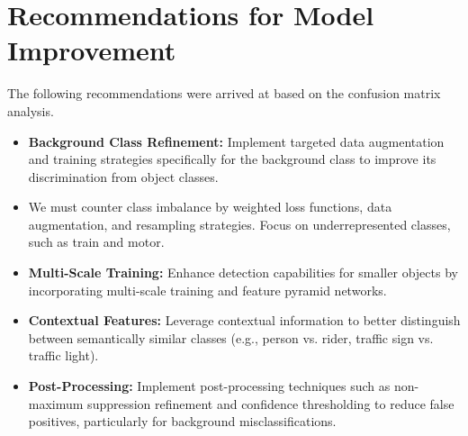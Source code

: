 \documentclass[12pt,a4paper]{report}
\theoremstyle{definition}
\theoremstyle{remark}
\begin{document}
\section*{Recommendations for Model Improvement}

The following recommendations were arrived at based on the confusion matrix analysis.

\begin{itemize}
	\item \textbf{Background Class Refinement:} Implement targeted data augmentation and training strategies specifically for the background class to improve its discrimination from object classes.
	
	\item We must counter class imbalance by weighted loss functions, data augmentation, and resampling strategies. Focus on underrepresented classes, such as train and motor.
	
	\item \textbf{Multi-Scale Training:} Enhance detection capabilities for smaller objects by incorporating multi-scale training and feature pyramid networks.
	
	\item \textbf{Contextual Features:} Leverage contextual information to better distinguish between semantically similar classes (e.g., person vs. rider, traffic sign vs. traffic light).
	
	\item \textbf{Post-Processing:} Implement post-processing techniques such as non-maximum suppression refinement and confidence thresholding to reduce false positives, particularly for background misclassifications.
\end{itemize}
\end{document}

